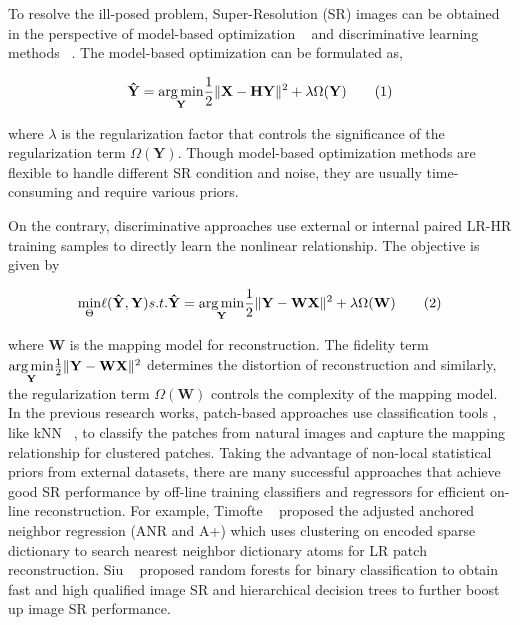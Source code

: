 \documentclass[10pt,twocolumn,letterpaper]{article}
\begin{document}
To resolve the ill-posed problem, Super-Resolution (SR) images can be obtained in the perspective of model-based optimization ~\cite{GMM,K-SVD,NCSR,BM3D,WNNM} and discriminative learning methods ~\cite{SRCNN,VDSR,DRRN,LapSRN,EDSR,DBPN}. The model-based optimization can be formulated as,
\begin{small}
\begin{equation}
\mathbf{\hat{Y}}=\underset{\mathbf{Y}}{\arg\min} \frac{1}{2}\Arrowvert\mathbf{X}-\mathbf{HY}\Arrowvert^2+\lambda\Omega(\mathbf{Y}) \tag{1}
\label{Equation 1}
\end{equation}
\end{small}{}
where $\lambda$ is the regularization factor that controls the significance of the regularization term $\Omega(\mathbf{Y})$. Though model-based optimization methods are flexible to handle different SR condition and noise, they are usually time-consuming and require various priors. 

On the contrary, discriminative approaches use external or internal paired LR-HR training samples to directly learn the nonlinear relationship. The objective is given by
\begin{small}
\begin{equation}
\underset{\Theta}{\min}\ell(\mathbf{\hat{Y}},\mathbf{Y}) s.t. \mathbf{\hat{Y}}=\underset{\mathbf{Y}}{\arg\min} \frac{1}{2}\Arrowvert\mathbf{Y}-\mathbf{WX}\Arrowvert^2+\lambda\Omega(\mathbf{W}) \tag{2}
\label{Equation 2}
\end{equation}
\end{small}
where $\mathbf{W}$ is the mapping model for reconstruction. The fidelity term $\underset{\mathbf{Y}}{\arg\min} \frac{1}{2}\Arrowvert\mathbf{Y}-\mathbf{WX}\Arrowvert^2$ determines the distortion of reconstruction and similarly, the regularization term $\Omega(\mathbf{W})$ controls the complexity of the mapping model. In the previous research works, patch-based approaches use classification tools , like kNN ~\cite{Chang2004}, to classify the patches from natural images and capture the mapping relationship for clustered patches. Taking the advantage of non-local statistical priors from external datasets, there are many successful approaches that achieve good SR performance by off-line training classifiers and regressors for efficient on-line reconstruction. For example, Timofte \etal ~\cite{Timofte2013,Timofte2015} proposed the adjusted anchored neighbor regression (ANR and A+) which uses clustering on encoded sparse dictionary to search nearest neighbor dictionary atoms for LR patch reconstruction. Siu \etal ~\cite{Junjie15,Junjie17,ISCAS17,ICIP18} proposed random forests for binary classification to obtain fast and high qualified image SR and hierarchical decision trees to further boost up image SR performance. 
\end{document}
